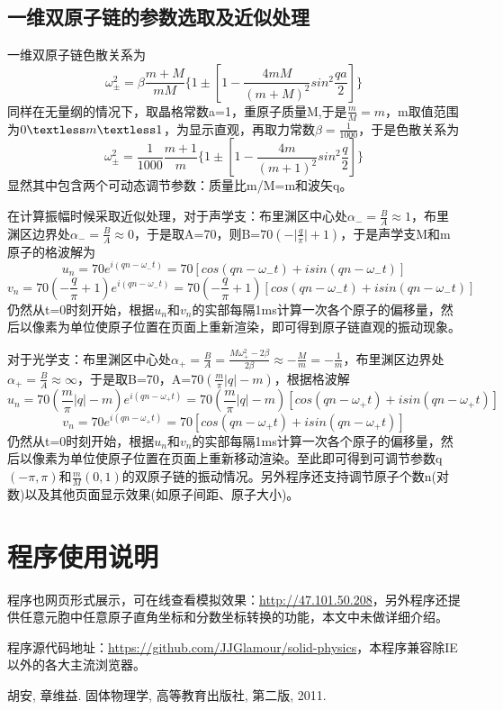 \documentclass[UTF8]{article}
\begin{document}
\subsection{一维双原子链的参数选取及近似处理}
一维双原子链色散关系为$$\omega_\pm^2=\beta\frac{m+M}{mM}{\{1\pm[1-\frac{4mM}{(m+M)^2}sin^2\frac{qa}{2}]\}}$$同样在无量纲的情况下，取晶格常数a=1，重原子质量M,于是$\frac{m}{M}=m$，m取值范围为$0\textless m \textless1$，为显示直观，再取力常数$\beta=\frac{1}{1000}$，于是色散关系为
$$\omega_\pm^2=\frac{1}{1000}\frac{m+1}{m}{\{1\pm[1-\frac{4m}{(m+1)^2}sin^2\frac{q}{2}]\}}$$
显然其中包含两个可动态调节参数：质量比m/M=m和波矢q。
\par
在计算振幅时候采取近似处理，对于声学支：布里渊区中心处$\alpha_-=\frac{B}{A}\approx1$，布里渊区边界处$\alpha_-=\frac{B}{A}\approx0$，于是取A=70，则B=$70(-\vert\frac{q}{\pi}\vert+1)$，于是声学支M和m原子的格波解为
$$u_n=70e^{i(qn-\omega_- t)}=70[cos(qn-\omega_- t)+isin(qn-\omega_- t)]$$
$$v_n=70(-\frac{q}{\pi}+1)e^{i(qn-\omega_- t)}=70(-\frac{q}{\pi}+1)[cos(qn-\omega_- t)+isin(qn-\omega_- t)]$$
仍然从t=0时刻开始，根据$u_n$和$v_n$的实部每隔1ms计算一次各个原子的偏移量，然后以像素为单位使原子位置在页面上重新渲染，即可得到原子链直观的振动现象。
\par
对于光学支：布里渊区中心处$\alpha_+=\frac{B}{A}=\frac{M\omega_+^2-2\beta}{2\beta}\approx-\frac{M}{m}=-\frac{1}{m}$，布里渊区边界处$\alpha_+=\frac{B}{A}\approx\infty$，于是取B=70，A=$70(\frac{m}{\pi}\vert q\vert -m)$，根据格波解
$$u_n=70(\frac{m}{\pi}\vert q\vert -m)e^{i(qn-\omega_+ t)}=70(\frac{m}{\pi}{\vert q\vert} -m)[cos(qn-\omega_+ t)+isin(qn-\omega_+ t)]$$
$$v_n=70e^{i(qn-\omega_+ t)}=70[cos(qn-\omega_+ t)+isin(qn-\omega_+ t)]$$
仍然从t=0时刻开始，根据$u_n$和$v_n$的实部每隔1ms计算一次各个原子的偏移量，然后以像素为单位使原子位置在页面上重新移动渲染。至此即可得到可调节参数q$(-\pi,\pi)$和$\frac{m}{M}(0,1)$的双原子链的振动情况。另外程序还支持调节原子个数n(对数)以及其他页面显示效果(如原子间距、原子大小)。


\section{程序使用说明}
程序也网页形式展示，可在线查看模拟效果：\href{http://47.101.50.208}{http://47.101.50.208}，另外程序还提供任意元胞中任意原子直角坐标和分数坐标转换的功能，本文中未做详细介绍。
\par
程序源代码地址：\href{https://github.com/JJGlamour/solid-physics}{https://github.com/JJGlamour/solid-physics}，本程序兼容除IE以外的各大主流浏览器。



\begin{thebibliography}{99}  
胡安, 章维益. 固体物理学, 高等教育出版社, 第二版, 2011.  
\end{thebibliography}
\end{document}
